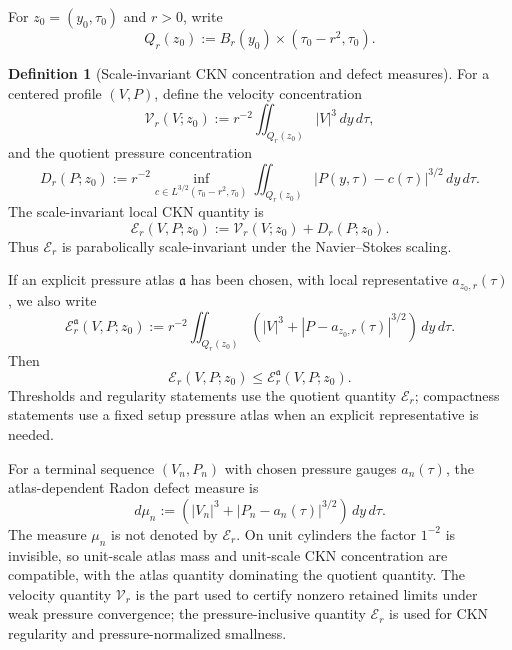 \documentclass[11pt]{amsart}
\numberwithin{equation}{section}
\theoremstyle{plain}
\theoremstyle{definition}
\newtheorem{definition}[definition]{Definition}
\theoremstyle{remark}
\newcommand{\calE}{\mathcal E}
\newcommand{\Vel}{\mathcal V}
\begin{document}
For \(z_0=(y_0,\tau_0)\) and \(r>0\), write
\[
   Q_r(z_0):=B_r(y_0)\times(\tau_0-r^2,\tau_0).
\]

\begin{definition}[Scale-invariant CKN concentration and defect measures]
\label{def:local-critical-quantity}
For a centered profile \((V,P)\), define the velocity concentration
\begin{equation}\label{eq:velocity-activity-main}
   \Vel_r(V;z_0)
   :=
   r^{-2}\iint_{Q_r(z_0)} |V|^3\,dy\,d\tau,
\end{equation}
and the quotient pressure concentration
\begin{equation}\label{eq:pressure-activity-main}
   D_r(P;z_0)
   :=
   r^{-2}
   \inf_{c\in L^{3/2}(\tau_0-r^2,\tau_0)}
   \iint_{Q_r(z_0)}
      |P(y,\tau)-c(\tau)|^{3/2}\,dy\,d\tau .
\end{equation}
The scale-invariant local CKN quantity is
\begin{equation}\label{eq:local-energy-main}
   \calE_r(V,P;z_0):=\Vel_r(V;z_0)+D_r(P;z_0).
\end{equation}
Thus \(\calE_r\) is parabolically scale-invariant under the Navier--Stokes
scaling.

If an explicit pressure atlas \(\mathfrak a\) has been chosen, with local
representative \(a_{z_0,r}(\tau)\), we also write
\begin{equation}\label{eq:atlas-dependent-activity-main}
   \calE_r^{\mathfrak a}(V,P;z_0)
   :=
   r^{-2}
   \iint_{Q_r(z_0)}
      \left(|V|^3+|P-a_{z_0,r}(\tau)|^{3/2}\right)\,dy\,d\tau .
\end{equation}
Then
\[
   \calE_r(V,P;z_0)\le \calE_r^{\mathfrak a}(V,P;z_0).
\]
Thresholds and regularity statements use the quotient quantity \(\calE_r\);
compactness statements use a fixed setup pressure atlas when an explicit
representative is needed.

For a terminal sequence \((V_n,P_n)\) with chosen pressure gauges \(a_n(\tau)\),
the atlas-dependent Radon defect measure is
\begin{equation}\label{eq:raw-defect-measure-main}
   d\mu_n
   :=
   \left(|V_n|^3+|P_n-a_n(\tau)|^{3/2}\right)\,dy\,d\tau .
\end{equation}
The measure \(\mu_n\) is not denoted by \(\calE_r\).  On unit cylinders the
factor \(1^{-2}\) is invisible, so unit-scale atlas mass and
unit-scale CKN concentration are compatible, with the atlas quantity dominating the
quotient quantity.
The velocity quantity \(\Vel_r\) is the part used to certify nonzero retained
limits under weak pressure convergence; the pressure-inclusive quantity
\(\calE_r\) is used for CKN regularity and pressure-normalized smallness.
\end{definition}
\end{document}
